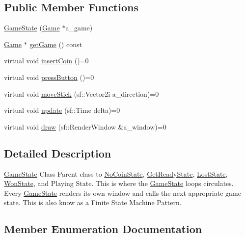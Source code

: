 \subsection*{Public Member Functions}
\begin{DoxyCompactItemize}
\item 
\hyperlink{class_game_state_a294ebc243ce5cf5f845b8548aba8e723}{Game\+State} (\hyperlink{class_game}{Game} $\ast$a\+\_\+game)
\item 
\hyperlink{class_game}{Game} $\ast$ \hyperlink{class_game_state_a7f1afbce585f48311006ddb00c26e32f}{get\+Game} () const
\item 
virtual void \hyperlink{class_game_state_a4cd6f5b4ad23fc08dca287df26d94b94}{insert\+Coin} ()=0
\item 
virtual void \hyperlink{class_game_state_aa14eeaf244bcf19b7013af75cb722dde}{press\+Button} ()=0
\item 
virtual void \hyperlink{class_game_state_aaae8c1b3ae6969eb2dd81bfc12fbf43f}{move\+Stick} (sf\+::\+Vector2i a\+\_\+direction)=0
\item 
virtual void \hyperlink{class_game_state_ab1fe4312f7ce88e7dc11f9935dee67d1}{update} (sf\+::\+Time delta)=0
\item 
virtual void \hyperlink{class_game_state_a5ffd5ce9acb7499ddef613e8836d1ef8}{draw} (sf\+::\+Render\+Window \&a\+\_\+window)=0
\end{DoxyCompactItemize}


\subsection{Detailed Description}
\hyperlink{class_game_state}{Game\+State} Class Parent class to \hyperlink{class_no_coin_state}{No\+Coin\+State}, \hyperlink{class_get_ready_state}{Get\+Ready\+State}, \hyperlink{class_lost_state}{Lost\+State}, \hyperlink{class_won_state}{Won\+State}, and Playing State. This is where the \hyperlink{class_game_state}{Game\+State} loops circulates. Every \hyperlink{class_game_state}{Game\+State} renders its own window and calls the next appropriate game state. This is also know as a Finite State Machine Pattern. 

\subsection{Member Enumeration Documentation}
\mbox{\label{class_game_state_a81618e0403319d48e9f25347111f8157}} 
